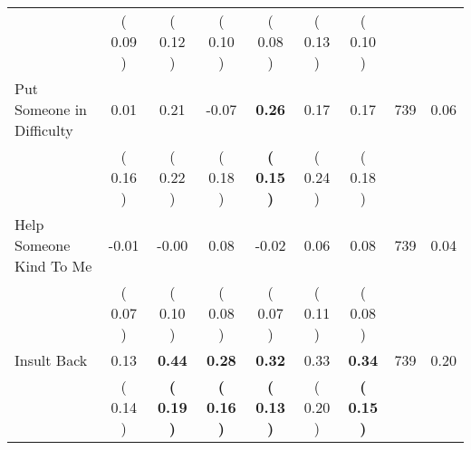 \begin{tabular}{lcccccccc}
 & (     0.09 ) & (     0.12 ) & (     0.10 ) & (     0.08 ) & (     0.13 ) & (     0.10 ) & \\
Put Someone in Difficulty &      0.01 &      0.21 &     -0.07 & \textbf{     0.26} &      0.17 &      0.17 & 739 &       0.06 \\ 
 & (     0.16 ) & (     0.22 ) & (     0.18 ) & \textbf{(     0.15 )} & (     0.24 ) & (     0.18 ) & \\
Help Someone Kind To Me &     -0.01 &     -0.00 &      0.08 &     -0.02 &      0.06 &      0.08 & 739 &       0.04 \\ 
 & (     0.07 ) & (     0.10 ) & (     0.08 ) & (     0.07 ) & (     0.11 ) & (     0.08 ) & \\
Insult Back &      0.13 & \textbf{     0.44} & \textbf{     0.28} & \textbf{     0.32} &      0.33 & \textbf{     0.34} & 739 &       0.20 \\ 
 & (     0.14 ) & \textbf{(     0.19 )} & \textbf{(     0.16 )} & \textbf{(     0.13 )} & (     0.20 ) & \textbf{(     0.15 )} & \\
\bottomrule
\end{tabular}
